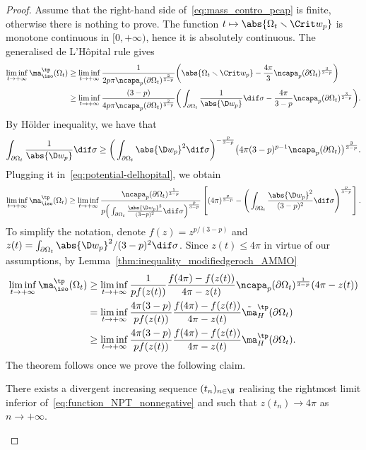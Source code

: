 \begin{proof} Assume that the right-hand side of~\eqref{eq:mass_contro_pcap} is finite, otherwise there is nothing to prove. The function $t\mapsto \abs{\Omega_t\smallsetminus \Crit w_p}$ is monotone continuous in $[0, +\infty)$, hence it is absolutely continuous. The generalised de L'H\^opital rule gives
\begin{align}
 \liminf_{t \to +\infty} \ma_{\iso}^{\tp}(\Omega_t)&{}\geq\liminf_{t \to +\infty} \frac{1}{2p\pi \ncapa_p(\partial \Omega_t)^{\frac{2}{3-p}}}\bigg( \abs{\Omega_t\smallsetminus \Crit w_p } -\frac{4 \pi}{3} \ncapa_p (\partial \Omega_t)^\frac{3}{3-p}\bigg)\nonumber\\
 &{}\geq \liminf_{t \to +\infty} \frac{(3-p)}{4 p\pi \ncapa_p(\partial \Omega_t)^{\frac{2}{3-p}}}\bigg(\int_{\partial \Omega_t} \frac{1}{\abs{\D w_p}} \dif \sigma-\frac{4 \pi}{3-p} \ncapa_p (\partial \Omega_t)^\frac{3}{3-p}\bigg).\label{eq:potential-delhopital}
\end{align}
By H\"{o}lder inequality, we have that
\[
 \int_{\partial \Omega_t }\frac{1}{\abs{\D w_p}} \dif \sigma \geq \bigg(\int_{\partial \Omega_t}\abs{\D w_p}^2 \dif \sigma\bigg)^{-\frac{p}{3-p}}\big( 4 \pi (3-p)^{p-1}\ncapa_p(\partial \Omega_t)\big)^{\frac{3}{3-p}}.
\]
Plugging it in~\eqref{eq:potential-delhopital}, we obtain
\[
 \liminf_{t \to +\infty} \ma_{\iso}^{\tp}(\Omega_t)\geq\liminf_{t \to +\infty} \frac{\ncapa_p(\partial \Omega_t)^{\frac{1}{3-p}}}{p\Big(\int_{\partial \Omega_t} \frac{\abs{ \D w_p}^2}{(3-p)^2} \dif \sigma\Big)^{\frac{p}{3-p}} }\left[ ( 4\pi)^{\frac{p}{3-p}}-\Bigg(\int_{\partial \Omega_t}\frac{\abs{ \D w_p}^2}{(3-p)^2} \dif \sigma \Bigg)^{\frac{p}{3-p}}\right].
\]
To simplify the notation, denote $f(z)=z^{p/(3-p)}$ and $z(t)=\int_{\partial \Omega_t} \abs{\D w_p}^2 /(3-p)^2 \dif \sigma$. Since $z(t)\leq 4 \pi$ in virtue of our assumptions, by Lemma~\ref{thm:inequality_modifiedgeroch_AMMO}
\begin{align}
 \liminf_{t \to +\infty} \ma_{\iso}^{\tp}(\Omega_t)&{}\geq \liminf_{t \to +\infty}\frac{1}{p f(z(t))} \frac{f(4 \pi )-f(z(t))}{4\pi-z(t)} \ncapa_p(\partial \Omega_t)^{\frac{1}{3-p}}( 4 \pi -z(t)) \nonumber\\
 &{}=\liminf_{t \to +\infty}\frac{4\pi(3-p)}{p f(z(t))} \frac{f(4 \pi )-f(z(t))}{4\pi-z(t)} \tilde{\ma}_{H}^{\tp}(\partial \Omega_t) \nonumber\\
 &{}\geq \liminf_{t \to +\infty}\frac{4\pi(3-p)}{p f(z(t))} \frac{f(4 \pi )-f(z(t))}{4\pi-z(t)} \ma_{H}^{\tp}(\partial \Omega_t).\label{eq:function_NPT_nonnegative}
\end{align}
The theorem follows once we prove the following claim.
\begin{Claim}
There exists a divergent increasing sequence $(t_n)_{n \in \N}$ realising the rightmost limit inferior of~\eqref{eq:function_NPT_nonnegative} and such that $z(t_n)\to 4 \pi$ as $n\to +\infty$.
\end{Claim}


\end{proof}
